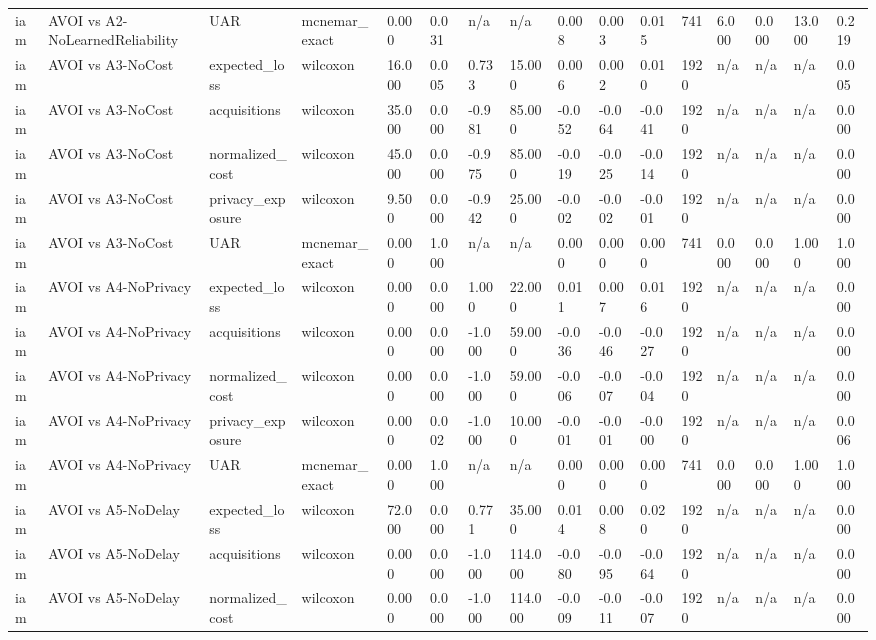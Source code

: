 \begin{table}[!ht]
{\begin{tabular}{llllllllllllllll}
iam & AVOI vs A2-NoLearnedReliability & UAR & mcnemar\_exact & 0.000 & 0.031 & n/a & n/a & 0.008 & 0.003 & 0.015 & 741 & 6.000 & 0.000 & 13.000 & 0.219 \\
iam & AVOI vs A3-NoCost & expected\_loss & wilcoxon & 16.000 & 0.005 & 0.733 & 15.000 & 0.006 & 0.002 & 0.010 & 1920 & n/a & n/a & n/a & 0.005 \\
iam & AVOI vs A3-NoCost & acquisitions & wilcoxon & 35.000 & 0.000 & -0.981 & 85.000 & -0.052 & -0.064 & -0.041 & 1920 & n/a & n/a & n/a & 0.000 \\
iam & AVOI vs A3-NoCost & normalized\_cost & wilcoxon & 45.000 & 0.000 & -0.975 & 85.000 & -0.019 & -0.025 & -0.014 & 1920 & n/a & n/a & n/a & 0.000 \\
iam & AVOI vs A3-NoCost & privacy\_exposure & wilcoxon & 9.500 & 0.000 & -0.942 & 25.000 & -0.002 & -0.002 & -0.001 & 1920 & n/a & n/a & n/a & 0.000 \\
iam & AVOI vs A3-NoCost & UAR & mcnemar\_exact & 0.000 & 1.000 & n/a & n/a & 0.000 & 0.000 & 0.000 & 741 & 0.000 & 0.000 & 1.000 & 1.000 \\
iam & AVOI vs A4-NoPrivacy & expected\_loss & wilcoxon & 0.000 & 0.000 & 1.000 & 22.000 & 0.011 & 0.007 & 0.016 & 1920 & n/a & n/a & n/a & 0.000 \\
iam & AVOI vs A4-NoPrivacy & acquisitions & wilcoxon & 0.000 & 0.000 & -1.000 & 59.000 & -0.036 & -0.046 & -0.027 & 1920 & n/a & n/a & n/a & 0.000 \\
iam & AVOI vs A4-NoPrivacy & normalized\_cost & wilcoxon & 0.000 & 0.000 & -1.000 & 59.000 & -0.006 & -0.007 & -0.004 & 1920 & n/a & n/a & n/a & 0.000 \\
iam & AVOI vs A4-NoPrivacy & privacy\_exposure & wilcoxon & 0.000 & 0.002 & -1.000 & 10.000 & -0.001 & -0.001 & -0.000 & 1920 & n/a & n/a & n/a & 0.006 \\
iam & AVOI vs A4-NoPrivacy & UAR & mcnemar\_exact & 0.000 & 1.000 & n/a & n/a & 0.000 & 0.000 & 0.000 & 741 & 0.000 & 0.000 & 1.000 & 1.000 \\
iam & AVOI vs A5-NoDelay & expected\_loss & wilcoxon & 72.000 & 0.000 & 0.771 & 35.000 & 0.014 & 0.008 & 0.020 & 1920 & n/a & n/a & n/a & 0.000 \\
iam & AVOI vs A5-NoDelay & acquisitions & wilcoxon & 0.000 & 0.000 & -1.000 & 114.000 & -0.080 & -0.095 & -0.064 & 1920 & n/a & n/a & n/a & 0.000 \\
iam & AVOI vs A5-NoDelay & normalized\_cost & wilcoxon & 0.000 & 0.000 & -1.000 & 114.000 & -0.009 & -0.011 & -0.007 & 1920 & n/a & n/a & n/a & 0.000 \\

\end{tabular}}
\end{table}
